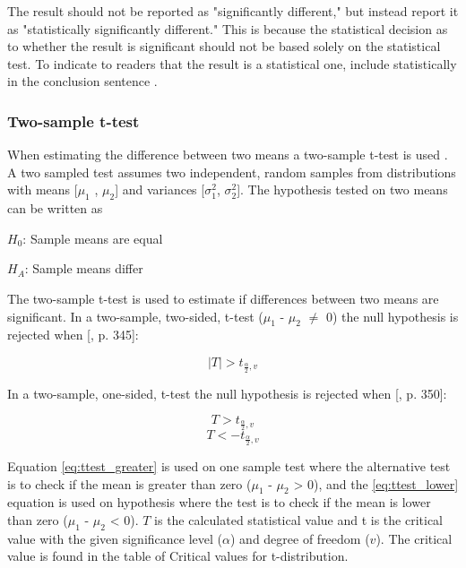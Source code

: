The result should not be reported as "significantly different," but instead report it as "statistically significantly different." This is because the statistical decision as to whether the result is significant should not be based solely on the statistical test. To indicate to readers that the result is a statistical one, include statistically in the conclusion sentence \citep{LundResearchLtd2013a}. 

\subsubsection{Two-sample t-test}\label{sec:t-test}
When estimating the difference between two means a two-sample t-test is used \citep{Walpole2012}. A two sampled test assumes two independent, random samples from distributions with means [$\mu_{1}$ , $\mu_{2}$] and variances [$\sigma_{1}^{2}$, $\sigma_{2}^{2}$]. %
The hypothesis tested on two means can be written as\newline

\centerline{$H_{0}$: Sample means are equal} 
\centerline{$H_{A}$: Sample means differ}

The two-sample t-test is used to estimate if differences between two means are significant. In a two-sample, two-sided, t-test ($\mu_{1}$ - $\mu_{2}$ $\neq$ 0) the null hypothesis is rejected when [\citep{Walpole2012}, p. 345]:

\begin{equation}
\label{eq:ttest_twoway}
|T| > t_{\frac{\alpha}{2}, v} 
\end{equation}

In a two-sample, one-sided, t-test the null hypothesis is rejected when [\citep{Walpole2012}, p. 350]:

\begin{equation}
\label{eq:ttest_greater}
T > t_{\frac{\alpha}{2}, v}
\end{equation}
\begin{equation}
\label{eq:ttest_lower}
T < - t_{\frac{\alpha}{2}, v}
\end{equation}

Equation \ref{eq:ttest_greater} is used on one sample test where the alternative test is to check if the mean is greater than zero ($\mu_{1}$ - $\mu_{2}$ > 0), and the \ref{eq:ttest_lower} equation is used on hypothesis where the test is to check if the mean is lower than zero ($\mu_{1}$ - $\mu_{2}$ < 0). $T$ is the calculated statistical value and t is the critical value with the given significance level ($\alpha$) and degree of freedom ($v$). The critical value is found in the table of Critical values for t-distribution. \newline 
 
